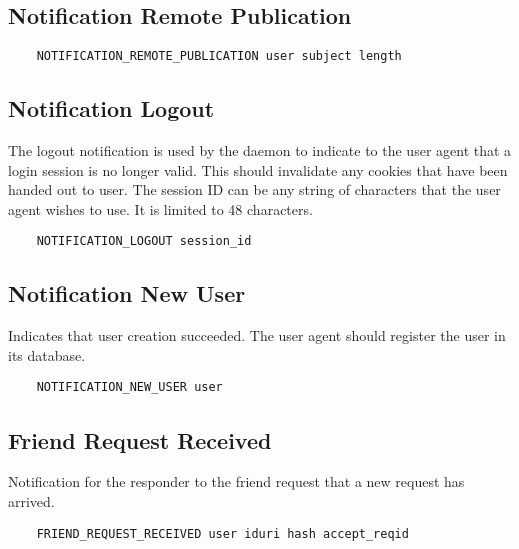 \documentclass[letterpaper,11pt,oneside]{article}
\begin{document}
\subsection{Notification Remote Publication}

\vspace{10pt}
\begin{verbatim}
    NOTIFICATION_REMOTE_PUBLICATION user subject length 
\end{verbatim}
\vspace{10pt}

\subsection{Notification Logout}

The logout notification is used by the daemon to indicate to the user agent
that a login session is no longer valid. This should invalidate any cookies
that have been handed out to user. The session ID can be any string of
characters that the user agent wishes to use. It is limited to 48 characters.

\vspace{10pt}
\begin{verbatim}
    NOTIFICATION_LOGOUT session_id
\end{verbatim}
\vspace{10pt}

\subsection{Notification New User}

Indicates that user creation succeeded. The user agent should register the user
in its database.

\vspace{10pt}
\begin{verbatim}
    NOTIFICATION_NEW_USER user
\end{verbatim}
\vspace{10pt}

\subsection{Friend Request Received}

Notification for the responder to the friend request that a new request has
arrived.

\vspace{10pt}
\begin{verbatim}
    FRIEND_REQUEST_RECEIVED user iduri hash accept_reqid
\end{verbatim}
\vspace{10pt}
\end{document}

